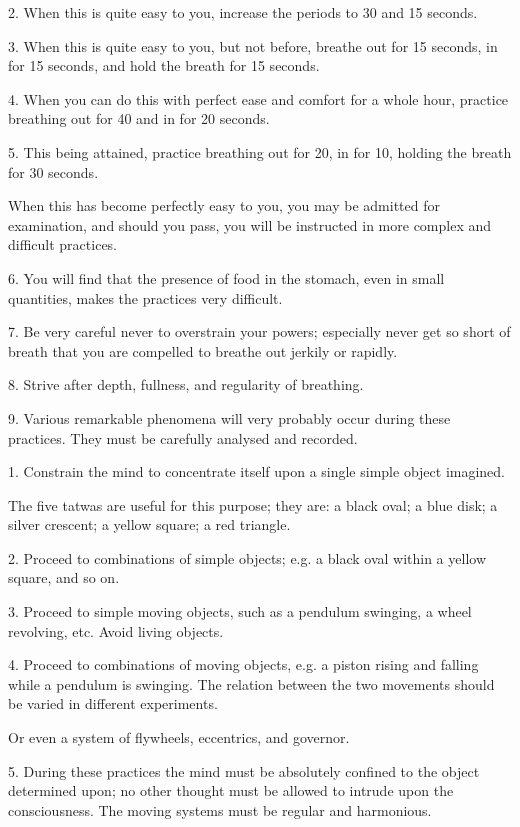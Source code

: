 2. When this is quite easy to you, increase the periods to 30 and 15 seconds.

3. When this is quite easy to you, but not before, breathe out for 15 seconds, in for 15 seconds, and hold the breath for 15 seconds.

4. When you can do this with perfect ease and comfort for a whole hour, practice breathing out for 40 and in for 20 seconds.

5. This being attained, practice breathing out for 20, in for 10, holding the breath for 30 seconds.

When this has become perfectly easy to you, you may be admitted for examination, and should you pass, you will be instructed in more complex and difficult practices.

6. You will find that the presence of food in the stomach, even in small quantities, makes the practices very difficult.

7. Be very careful never to overstrain your powers; especially never get so short of breath that you are compelled to breathe out jerkily or rapidly.

8. Strive after depth, fullness, and regularity of breathing.

9. Various remarkable phenomena will very probably occur during these practices. They must be carefully analysed and recorded.



1. Constrain the mind to concentrate itself upon a single simple object imagined.

The five tatwas are useful for this purpose; they are: a black oval; a blue disk; a silver crescent; a yellow square; a red triangle.

2. Proceed to combinations of simple objects; e.g. a black oval within a yellow square, and so on.

3. Proceed to simple moving objects, such as a pendulum swinging, a wheel revolving, etc. Avoid living objects.

4. Proceed to combinations of moving objects, e.g. a piston rising and falling while a pendulum is swinging. The relation between the two movements should be varied in different experiments.

Or even a system of flywheels, eccentrics, and governor.

5. During these practices the mind must be absolutely confined to the object determined upon; no other thought must be allowed to intrude upon the consciousness. The moving systems must be regular and harmonious.

